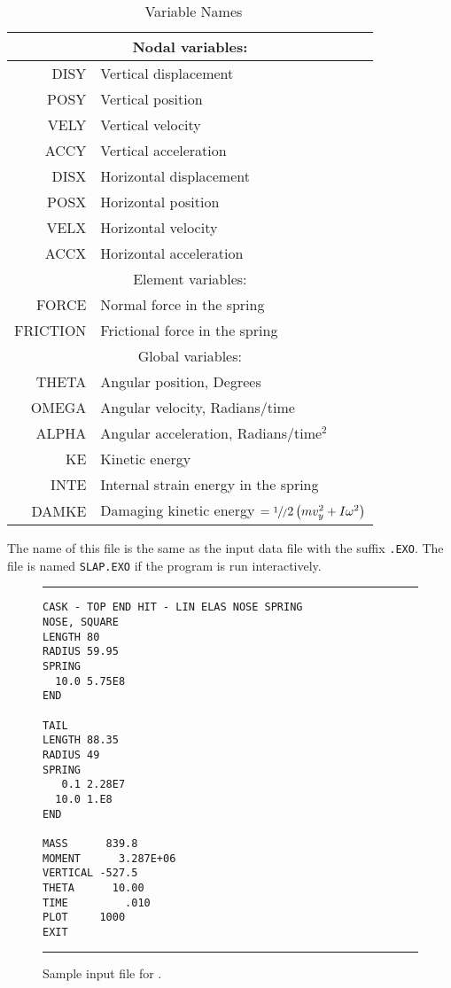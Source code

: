 \begin{table}
\begin{center}
\caption{\EXO\ Variable Names}\label{seatab}
\begin{tabular}{|r|l|}\hline
\multicolumn{2}{|c|}{Nodal variables:}\\ \hline
\sf DISY      & Vertical displacement\\
\sf POSY      & Vertical position\\
\sf VELY      & Vertical velocity\\
\sf ACCY      & Vertical acceleration\\
\sf DISX      & Horizontal displacement\\
\sf POSX      & Horizontal position\\
\sf VELX      & Horizontal velocity\\
\sf ACCX      & Horizontal acceleration\\ \hline\hline
\multicolumn{2}{|c|}{Element variables:}\\ \hline
\sf FORCE     & Normal force in the spring\\
\sf FRICTION  & Frictional force in the spring\\ \hline\hline
\multicolumn{2}{|c|}{Global variables:}\\ \hline
\sf THETA     & Angular position, Degrees\\
\sf OMEGA     & Angular velocity, Radians/time\\
\sf ALPHA     & Angular acceleration, Radians/time${}^2$\\
\sf KE        & Kinetic energy\\
\sf INTE      & Internal strain energy in the spring\\ 
\sf DAMKE     & Damaging kinetic energy 
                $=\sfrac1/2 \left(m v_y^2 + I \omega^2\right)$ \\ \hline
\end{tabular}
\end{center}
\end{table}
The name of this file is the same as the input data file with the suffix
{\tt .EXO}.  The file is named {\tt SLAP.EXO} if the program is run
interactively. 

\begin{figure}
\hrule\small
\begin{verbatim}
CASK - TOP END HIT - LIN ELAS NOSE SPRING
NOSE, SQUARE
LENGTH 80
RADIUS 59.95 
SPRING 
  10.0 5.75E8
END

TAIL
LENGTH 88.35
RADIUS 49
SPRING
   0.1 2.28E7
  10.0 1.E8
END

MASS      839.8
MOMENT      3.287E+06
VERTICAL -527.5
THETA      10.00
TIME         .010
PLOT     1000
EXIT
\end{verbatim}
\hrule
\caption{Sample input file for \SLAP.}\label{sampinput}
\end{figure}

